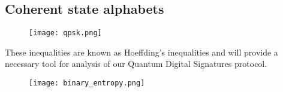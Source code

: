 \subsection{Coherent state alphabets}

\begin{figure}
\centering
\texttt{[image: qpsk.png]}
\caption{\label{fig:qpsk}}
\end{figure}
\noindent These inequalities are known as Hoeffding's inequalities  and will provide a necessary tool for analysis of our Quantum Digital Signatures protocol.

\begin{figure}
\centering
\texttt{[image: binary\_entropy.png]}
\caption{\label{fig:binary_entropy}}
\end{figure}
